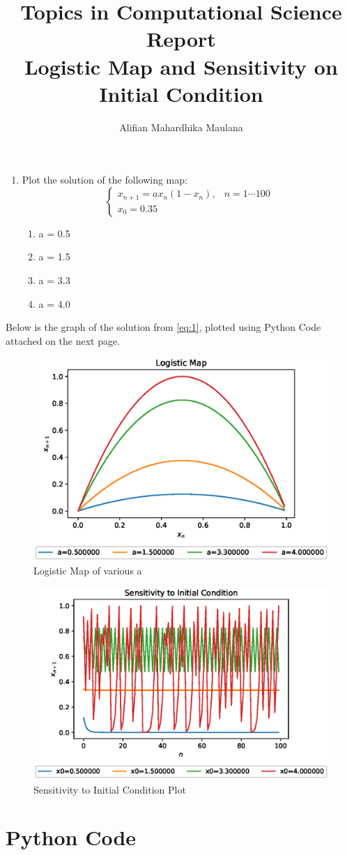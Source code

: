 \documentclass[a4paper,9pt]{article}
\title{Topics in Computational Science Report \\ Logistic Map and Sensitivity on Initial Condition}
\author{Alifian Mahardhika Maulana}
\begin{document}
\maketitle
\begin{enumerate}
	\item Plot the solution of the following map:
	\begin{equation}\label{eq:1}
	\begin{cases}
	x_{n+1} = ax_n(1-x_n), & n = 1\cdots 100\\
	x_0 = 0.35
	\end{cases}
	\end{equation}
	\begin{enumerate}
		\item a = 0.5
		\item a = 1.5
		\item a = 3.3
		\item a = 4.0
	\end{enumerate}
\end{enumerate}
Below is the graph of the solution from \eqref{eq:1}, plotted using Python Code attached on the next page.
\begin{figure}[h!]
	\centering
	\includegraphics[width=0.5\linewidth]{picture/logisticmap}
	\caption{Logistic Map of various a}
	\label{fig:logisticmap}
\end{figure}
\begin{figure}[h!]
	\centering
	\includegraphics[width=0.5\linewidth]{picture/sensitivity}
	\caption{Sensitivity to Initial Condition Plot}
	\label{fig:sensitivity}
\end{figure}
\newline
\section{Python Code}\label{code}

\end{document}
